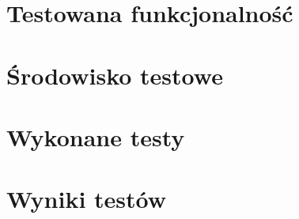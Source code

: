 \documentclass[../praca-dyplomowa.tex]{subfiles}
\begin{document}
\section{Testowana funkcjonalność}


\section{Środowisko testowe}


\section{Wykonane testy}


\section{Wyniki testów}

\end{document}
